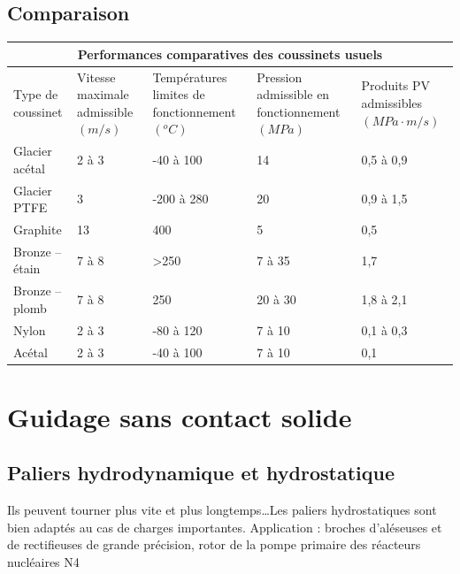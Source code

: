 \documentclass[11pt,oneside]{article}
\begin{document}
 
		
\subsection{Comparaison}
\begin{center}
\begin{tabular}{|p{}|p{}|p{}|p{}|p{}|}
\hline
\multicolumn{5}{|c|}{\textbf{Performances comparatives des coussinets usuels}}\\
\hline
Type de coussinet 
& Vitesse maximale admissible $(m/s)$ 
& Températures limites de fonctionnement $(^oC)$ 
& Pression admissible en fonctionnement $(MPa)$
& Produits PV admissibles $(MPa\cdot m/s)$ \\
\hline
Glacier acétal & 2 à 3 & -40 à 100 & 14 & 0,5 à 0,9 \\
\hline
Glacier PTFE & 3 & -200 à 280 & 20 & 0,9 à 1,5 \\
\hline
Graphite & 13 & 400 & 5 & 0,5 \\
\hline
Bronze -- étain & 7 à 8 & >250 & 7 à 35 & 1,7 \\
\hline
Bronze -- plomb & 7 à 8 & 250 & 20 à 30 & 1,8 à 2,1 \\
\hline
Nylon & 2 à 3 & -80 à 120 & 7 à 10 & 0,1 à 0,3 \\
\hline
Acétal & 2 à 3 & -40 à 100 & 7 à 10 & 0,1 \\
\hline
\end{tabular}
\end{center}

\section{Guidage sans contact solide}
\subsection{Paliers hydrodynamique et hydrostatique}

Ils  peuvent tourner plus vite et plus longtemps…Les paliers hydrostatiques sont bien adaptés au cas de charges importantes.
Application : broches d'aléseuses et de rectifieuses de grande précision, rotor de la pompe primaire des réacteurs nucléaires N4
\end{document}

